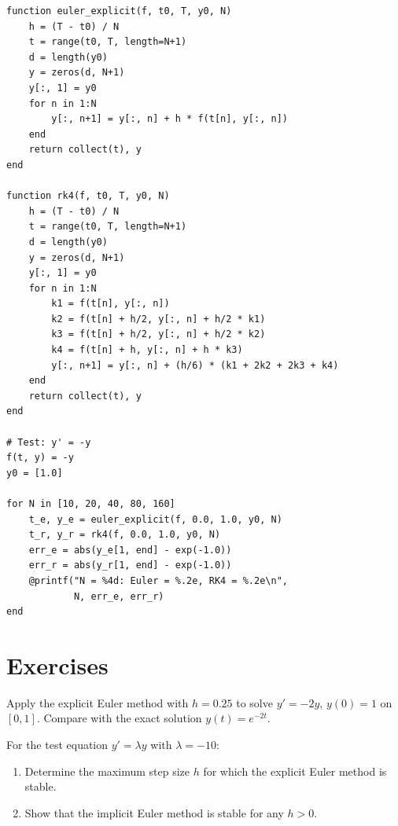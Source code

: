 \begin{codeblock}[title=\textbf{Julia --- ODE solvers}]
\begin{verbatim}
function euler_explicit(f, t0, T, y0, N)
    h = (T - t0) / N
    t = range(t0, T, length=N+1)
    d = length(y0)
    y = zeros(d, N+1)
    y[:, 1] = y0
    for n in 1:N
        y[:, n+1] = y[:, n] + h * f(t[n], y[:, n])
    end
    return collect(t), y
end

function rk4(f, t0, T, y0, N)
    h = (T - t0) / N
    t = range(t0, T, length=N+1)
    d = length(y0)
    y = zeros(d, N+1)
    y[:, 1] = y0
    for n in 1:N
        k1 = f(t[n], y[:, n])
        k2 = f(t[n] + h/2, y[:, n] + h/2 * k1)
        k3 = f(t[n] + h/2, y[:, n] + h/2 * k2)
        k4 = f(t[n] + h, y[:, n] + h * k3)
        y[:, n+1] = y[:, n] + (h/6) * (k1 + 2k2 + 2k3 + k4)
    end
    return collect(t), y
end

# Test: y' = -y
f(t, y) = -y
y0 = [1.0]

for N in [10, 20, 40, 80, 160]
    t_e, y_e = euler_explicit(f, 0.0, 1.0, y0, N)
    t_r, y_r = rk4(f, 0.0, 1.0, y0, N)
    err_e = abs(y_e[1, end] - exp(-1.0))
    err_r = abs(y_r[1, end] - exp(-1.0))
    @printf("N = %4d: Euler = %.2e, RK4 = %.2e\n",
            N, err_e, err_r)
end
\end{verbatim}
\end{codeblock}

\section{Exercises}

\begin{exercise}[$\star$]
\label{ex:ch9-euler-hand}
Apply the explicit Euler method with $h = 0.25$ to solve $y' = -2y$, $y(0)=1$ on $[0,1]$. Compare with the exact solution $y(t) = e^{-2t}$.
\end{exercise}

\begin{exercise}[$\star$]
\label{ex:ch9-stability-euler}
For the test equation $y' = \lambda y$ with $\lambda = -10$:
\begin{enumerate}
    \item Determine the maximum step size $h$ for which the explicit Euler method is stable.
    \item Show that the implicit Euler method is stable for any $h > 0$.
\end{enumerate}
\end{exercise}

